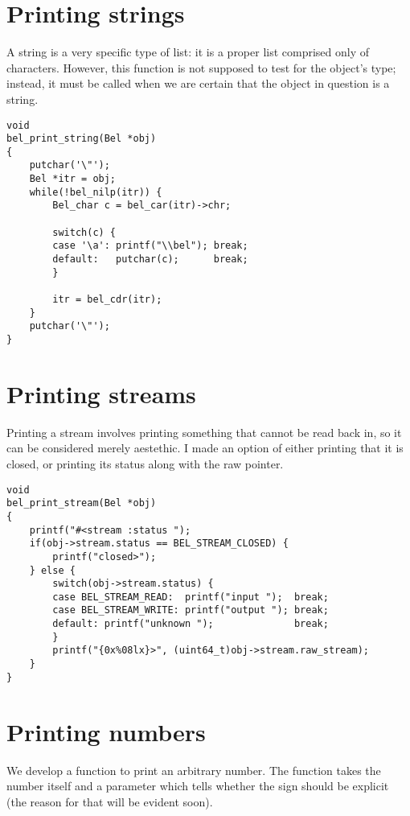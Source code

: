 \documentclass[openright,a4paper,twoside,12pt]{memoir}
\begin{document}
\section{Printing strings}
\label{sec:org146716c}

A string is a very specific type of list: it is a proper list
comprised only of characters. However, this function is not supposed
to test for the object's type; instead, it must be called when we are
certain that the object in question is a string.

\begin{verbatim}
void
bel_print_string(Bel *obj)
{
    putchar('\"');
    Bel *itr = obj;
    while(!bel_nilp(itr)) {
        Bel_char c = bel_car(itr)->chr;

        switch(c) {
        case '\a': printf("\\bel"); break;
        default:   putchar(c);      break;
        }

        itr = bel_cdr(itr);
    }
    putchar('\"');
}
\end{verbatim}

\section{Printing streams}
\label{sec:orgeb39526}

Printing a stream involves printing something that cannot be read back
in, so it can be considered merely aestethic. I made an option of
either printing that it is closed, or printing its status along with
the raw pointer.

\begin{verbatim}
void
bel_print_stream(Bel *obj)
{
    printf("#<stream :status ");
    if(obj->stream.status == BEL_STREAM_CLOSED) {
        printf("closed>");
    } else {
        switch(obj->stream.status) {
        case BEL_STREAM_READ:  printf("input ");  break;
        case BEL_STREAM_WRITE: printf("output "); break;
        default: printf("unknown ");              break;
        }
        printf("{0x%08lx}>", (uint64_t)obj->stream.raw_stream);
    }
}
\end{verbatim}

\section{Printing numbers}
\label{sec:orge4b5fd8}

We develop a function to print an arbitrary number. The function takes
the number itself and a parameter which tells whether the sign should
be explicit (the reason for that will be evident soon).
\end{document}
